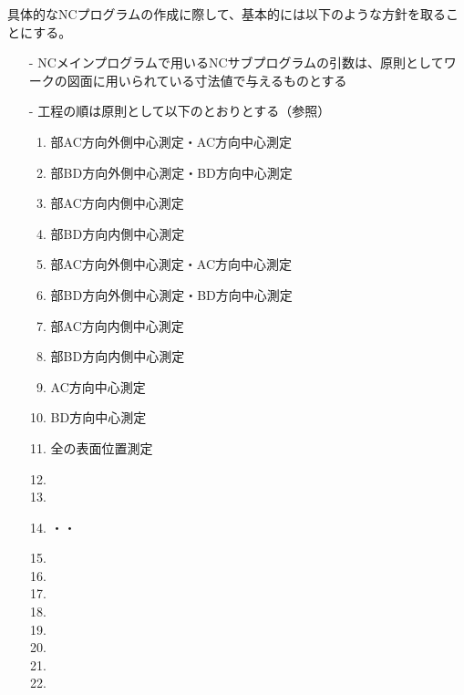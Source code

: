 \clearpage
具体的なNCプログラムの作成に際して、基本的には以下のような方針を取ることにする。
\begin{enumerate}
\item[-] NCメインプログラムで用いるNCサブプログラムの引数は、原則としてワークの図面に用いられている寸法値で与えるものとする
\item[-] 工程の順は原則として以下のとおりとする（参照）
\begin{enumerate}[label={\arabic*.}]
\item \BottomEndFace 部AC方向外側中心測定・\BottomOutcut AC方向中心測定
\item \BottomEndFace 部BD方向外側中心測定・\BottomOutcut BD方向中心測定
\item \BottomEndFace 部AC方向内側中心測定
\item \BottomEndFace 部BD方向内側中心測定
\item \TopEndFace 部AC方向外側中心測定・\TopOutcut AC方向中心測定
\item \TopEndFace 部BD方向外側中心測定・\TopOutcut BD方向中心測定
\item \TopEndFace 部AC方向内側中心測定
\item \TopEndFace 部BD方向内側中心測定
\item \Keyway AC方向中心測定
\item \Keyway BD方向中心測定
\item 全\Dimple の表面位置測定
\item \DimpleMilling
\item \TopEndFacecutMilling
\item \TopOutcutMilling・\EndFaceBoringMilling・\IncutBoringMilling
\item \KeywayMilling
\item \TopEndFaceOutCChamferMilling
\item \TopEndFaceInCChamferMilling
\item \BottomEndFacecutMilling
\item \BottomOutcutMilling
\item \BottomEndFaceOutCChamferMilling
\item \BottomEndFaceInCChamferMilling
\item \CenterlineEndFaceDifMeasurement
\end{enumerate}
\end{enumerate}


